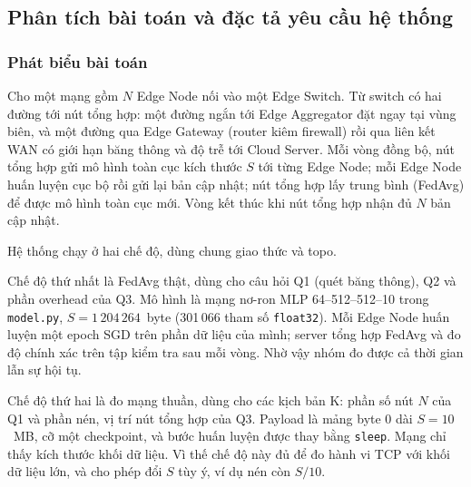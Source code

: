 \subsection{Phân tích bài toán và đặc tả yêu cầu hệ thống}
\label{sec:2-2}

\subsubsection{Phát biểu bài toán}
Cho một mạng gồm $N$ Edge Node nối vào một Edge Switch. Từ switch có hai đường tới nút tổng hợp: một đường ngắn tới Edge Aggregator đặt ngay tại vùng biên, và một đường qua Edge Gateway (router kiêm firewall) rồi qua liên kết WAN có giới hạn băng thông và độ trễ tới Cloud Server.
Mỗi vòng đồng bộ, nút tổng hợp gửi mô hình toàn cục kích thước $S$ tới từng Edge Node; mỗi Edge Node huấn luyện cục bộ rồi gửi lại bản cập nhật; nút tổng hợp lấy trung bình (FedAvg) để được mô hình toàn cục mới. Vòng kết thúc khi nút tổng hợp nhận đủ $N$ bản cập nhật.

Hệ thống chạy ở hai chế độ, dùng chung giao thức và topo.

Chế độ thứ nhất là FedAvg thật, dùng cho câu hỏi Q1 (quét băng thông), Q2 và phần overhead của Q3. Mô hình là mạng nơ-ron MLP 64--512--512--10 trong \texttt{model.py}, $S = 1\,204\,264$~byte (301\,066 tham số \texttt{float32}). Mỗi Edge Node huấn luyện một epoch SGD trên phần dữ liệu của mình; server tổng hợp FedAvg và đo độ chính xác trên tập kiểm tra sau mỗi vòng. Nhờ vậy nhóm đo được cả thời gian lẫn sự hội tụ.

Chế độ thứ hai là đo mạng thuần, dùng cho các kịch bản K: phần số nút $N$ của Q1 và phần nén, vị trí nút tổng hợp của Q3. Payload là mảng byte 0 dài $S = 10$~MB, cỡ một checkpoint, và bước huấn luyện được thay bằng \texttt{sleep}. Mạng chỉ thấy kích thước khối dữ liệu. Vì thế chế độ này đủ để đo hành vi TCP với khối dữ liệu lớn, và cho phép đổi $S$ tùy ý, ví dụ nén còn $S/10$.


